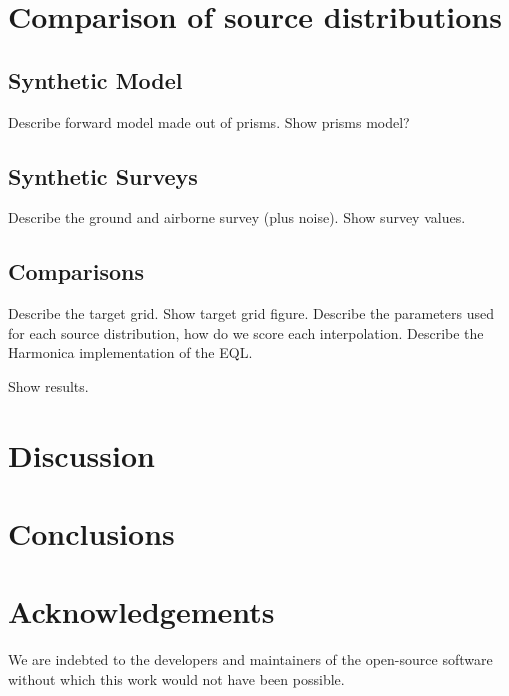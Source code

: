\documentclass[twocolumn]{article}
\begin{document}

\section{Comparison of source distributions}

\subsection{Synthetic Model}

Describe forward model made out of prisms.
Show prisms model?

\subsection{Synthetic Surveys}

Describe the ground and airborne survey (plus noise).
Show survey values.

\subsection{Comparisons}

Describe the target grid. Show target grid figure.
Describe the parameters used for each source distribution, how do we score each interpolation.
Describe the Harmonica implementation of the EQL.

Show results.


\section{Discussion}


\section{Conclusions}


\section{Acknowledgements}

We are indebted to the developers and maintainers of the open-source software without
which this work would not have been possible.




\end{document}

